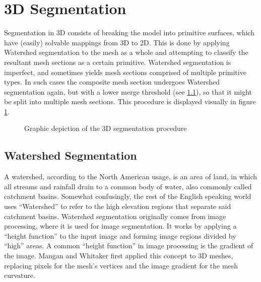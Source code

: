 \section{3D Segmentation}
Segmentation in 3D consists of breaking the model into primitive surfaces, which have (easily) solvable mappings from 3D to 2D.
This is done by applying Watershed segmentation to the mesh as a whole and attempting to classify the resultant mesh sections as a certain primitive.
Watershed segmentation is imperfect, and sometimes yields mesh sections comprised of multiple primitive types.
In such cases the composite mesh section undergoes Watershed segmentation again, but with a lower merge threshold (see \ref{ws_seg}), so that it might be split into multiple mesh sections.
This procedure is displayed visually in figure \ref{fig:Seg3D}.

\begin{figure}\label{fig:Seg3D}
	\centering
{}
\caption{Graphic depiction of the 3D segmentation procedure}
\end{figure}

\subsection{Watershed Segmentation}\label{ws_seg}
A watershed, according to the North American usage, is an area of land, in which all streams and rainfall drain to a common body of water\cite{USGS_Watersheds}, also commonly called catchment basins.
Somewhat confusingly, the rest of the English speaking world uses ``Watershed'' to refer to the high elevation regions that separate said catchment basins.
Watershed segmentation originally comes from image processing, where it is used for image segmentation\cite{ImageSegWS, DigitalImageProc}.
It works by applying a ``height function'' to the input image and forming image regions divided by ``high'' areas.
A common ``height function'' in image processing is the gradient of the image\cite{ImageSegWS}.
Mangan and Whitaker first applied this concept to 3D meshes, replacing pixels for the mesh's vertices and the image gradient for the mesh curvature\cite{Watershed}.

